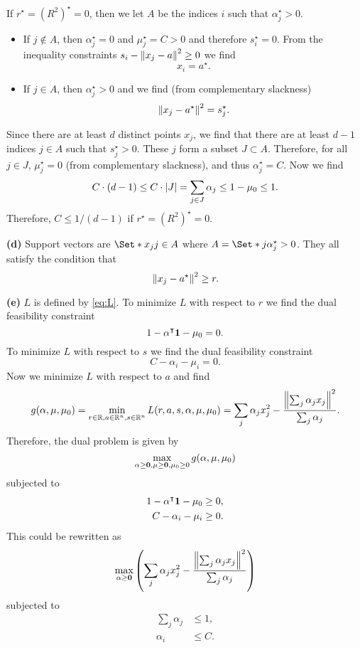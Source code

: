 \documentclass{article}
\makeatletter
\newcommand*{\shifttext}[1]{%
  \settowidth{\@tempdima}{#1}%
  \hspace{-\@tempdima}#1%
}
\newcommand{\plabel}[1]{%
\shifttext{\textbf{#1}\quad}%
}
\makeatother
\begin{document}
\par

If $r^\star = (R^2)^\star = 0$, then we let $A$ be the indices $i$ such that $\alpha^\star_j > 0$.
\begin{itemize}
    \item If $j\notin A$, then $\alpha^\star_j = 0$ and $\mu^\star_j = C > 0$ and therefore $s^\star_i = 0$.
    From the inequality constraints $s_i - \norm{x_j - a}^2 \ge 0$ we find
    \[ x_i = a^\star. \]
    \item If $j\in A$, then $\alpha^\star_j > 0$ and we find (from complementary slackness)
    \[ \norm{x_j - a^\star}^2 = s_j^\star. \]
\end{itemize}
Since there are at least $d$ distinct points $x_j$, we find that there are at least $d-1$ indices $j\in A$ such that $s_j^\star > 0$.
These $j$ form a subset $J\subset A$.
Therefore, for all $j\in J$, $\mu^\star_j = 0$ (from complementary slackness), and thus $\alpha^\star_j = C$.
Now we find
\[ C\cdot (d-1) \le C\cdot \abs{J} = \sum_{j\in J} \alpha_j \le 1 - \mu_0 \le 1. \]
Therefore, $C \le 1/(d-1)$ if $r^\star = (R^2)^\star = 0$.

\plabel{(d)}%
Support vectors are $\Set*{x_j}{j\in A}$ where $A = \Set*{j}{\alpha^\star_j > 0}$.
They all satisfy the condition that
\[ \norm{x_j - a^\star}^2 \ge r. \]

\plabel{(e)}%
$L$ is defined by \cref{eq:L}.
To minimize $L$ with respect to $r$ we find the dual feasibility constraint
\[ 1 - \alpha^\intercal \vb{1} - \mu_0 = 0. \]
To minimize $L$ with respect to $s$ we find the dual feasibility constraint
\[ C - \alpha_i - \mu_i = 0. \]
Now we minimize $L$ with respect to $a$ and find
\[ g(\alpha,\mu,\mu_0) = \min_{r\in\mathbb{R},a\in\mathbb{R}^n,s\in\mathbb{R}^n} L(r,a,s,\alpha,\mu,\mu_0) = \sum_j \alpha_j x_j^2 - \frac{\norm{\sum_j \alpha_j x_j}^2}{\sum_j \alpha_j}. \]
Therefore, the dual problem is given by
\[ \max_{\alpha\ge \vb{0},\mu\ge\vb{0},\mu_0\ge 0} g(\alpha,\mu,\mu_0) \]
subjected to
\begin{align*}
    1 - \alpha^\intercal \vb{1} - \mu_0 &\ge 0, \\
    C - \alpha_i - \mu_i &\ge 0.
\end{align*}
This could be rewritten as
\[ \max_{\alpha\ge\vb{0}} \qty(\sum_j \alpha_j x_j^2 - \frac{\norm{\sum_j \alpha_j x_j}^2}{\sum_j \alpha_j}) \]
subjected to
\begin{align*}
    \sum_j \alpha_j &\le 1, \\
    \alpha_i &\le C.
\end{align*}
\end{document}

